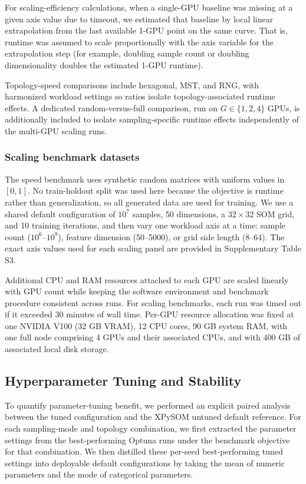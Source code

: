 \documentclass[10pt]{article} %
\begin{document}
For scaling-efficiency calculations, when a single-GPU baseline was missing at a given axis value due to timeout, we estimated that baseline by local linear extrapolation from the last available 1-GPU point on the same curve. That is, runtime was assumed to scale proportionally with the axis variable for the extrapolation step (for example, doubling sample count or doubling dimensionality doubles the estimated 1-GPU runtime).

Topology-speed comparisons include hexagonal, MST, and RNG, with harmonized workload settings so ratios isolate topology-associated runtime effects. A dedicated random-versus-full comparison, run on $G\in\{1,2,4\}$ GPUs, is additionally included to isolate sampling-specific runtime effects independently of the multi-GPU scaling runs.

\subsubsection{Scaling benchmark datasets}

The speed benchmark uses synthetic random matrices with uniform values in $[0,1]$. No train-holdout split was used here because the objective is runtime rather than generalization, so all generated data are used for training. We use a shared default configuration of $10^7$ samples, 50 dimensions, a $32 \times 32$ SOM grid, and 10 training iterations, and then vary one workload axis at a time: sample count ($10^6$--$10^9$), feature dimension (50--5000), or grid side length (8--64). The exact axis values used for each scaling panel are provided in Supplementary Table S3.

Additional CPU and RAM resources attached to each GPU are scaled linearly with GPU count while keeping the software environment and benchmark procedure consistent across runs. For scaling benchmarks, each run was timed out if it exceeded 30 minutes of wall time. Per-GPU resource allocation was fixed at one NVIDIA V100 (32 GB VRAM), 12 CPU cores, 90 GB system RAM, with one full node comprising 4 GPUs and their associated CPUs, and with 400 GB of associated local disk storage.

\subsection{Hyperparameter Tuning and Stability}

To quantify parameter-tuning benefit, we performed an explicit paired analysis between the tuned configuration and the XPySOM untuned default reference. For each sampling-mode and topology combination, we first extracted the parameter settings from the best-performing Optuna runs under the benchmark objective for that combination. We then distilled these per-seed best-performing tuned settings into deployable default configurations by taking the mean of numeric parameters and the mode of categorical parameters.
\end{document}
